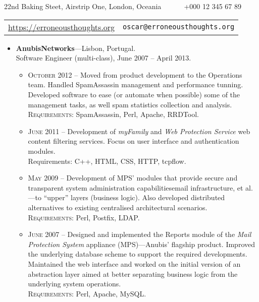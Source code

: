 \documentclass[a4paper,9pt]{extarticle}
\newenvironment{topic}[1]
   {{\noindent\large\bfseries\raisebox{0pt}[\height][1ex]{#1}\hrule}%
    \begin{list}{}{%
       \setlength{\leftmargin}{.0cm}}%
    \item[]}
   {\end{list}\medskip}
\newenvironment{header}[1]
   {\centering{\noindent\large\bfseries\raisebox{0pt}[\height][1ex]{\LARGE\bfseries #1}\hrule}%
    \begin{center}}
   {\end{center}\medskip}
\begin{document}
\begin{header}
  {Óscar Francisco Godinho Pereira} 
  { 22nd Baking Steet, Airstrip One, London, Oceania \verb+     + \Telefon +000 12 345 67 89 }\\[5pt]
  \begin{tabular}{l|r}
    \url{https://erroneousthoughts.org} & \texttt{oscar@erroneousthoughts.org} 
  \end{tabular}
\end{header}

\begin{topic}{Professional Experience}
  \begin{itemize}[leftmargin=*]
    \item {\bfseries AnubisNetworks}---Lisbon, Portugal.\\
      Software Engineer (multi-class), June 2007 -- April 2013.
      \begin{itemize}
	\item {\scshape October 2012} -- Moved from product development to the Operations team. Handled 
	  SpamAssassin management and performance tunning. Developed software to 
	  ease (or automate when possible) some of the management tasks, as well spam 
	  statistics collection and analysis.\\
	  {\scshape Requirements}: SpamAssassin, Perl, Apache, RRDTool.
	\item {\scshape June 2011} -- Development of \emph{myFamily} and \emph{Web Protection Service} 
	  web content filtering services. Focus on user interface and authentication modules.\\
	  {Requirements}: C++, HTML, CSS, HTTP, tcpflow.
	\item {\scshape May 2009} -- Development of MPS' modules that provide secure and transparent 
	  system administration capabilities\textemdash email infrastructure, et al.---to 
	  ``upper'' layers (business logic). Also developed distributed 
	  alternatives to existing centralised architectural scenarios.\\
	  {\scshape Requirements}: Perl, Postfix, LDAP.
	\item {\scshape June 2007} -- Designed and implemented the Reports module of the \emph{Mail 
	  Protection System}\textsuperscript{\texttrademark} appliance 
	  (MPS)---Anubis' flagship product. Improved the underlying database 
	  scheme to support the required developments. Maintained the web 
	  interface and worked on the initial version of an abstraction layer 
	  aimed at better separating business logic from the underlying system 
	  operations.\\
	  {\scshape Requirements}: Perl, Apache, MySQL.
      \end{itemize}
  \end{itemize}
\end{topic}
\end{document}
